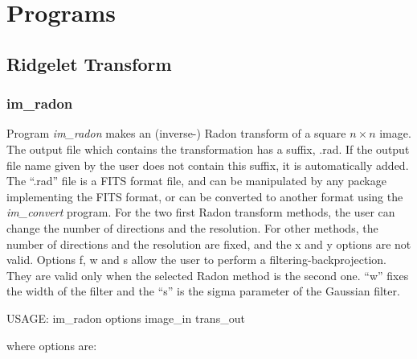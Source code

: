 \chapter{\projcur Programs}
\section{Ridgelet Transform}
\subsection{im\_radon}
Program {\em im\_radon} makes an (inverse-) Radon transform of a square
$n \times n$ image.
The output file which contains the transformation has a 
suffix, .rad. If the output file name
given by the user does not contain this suffix, it is automatically
added. The ``.rad'' file is a FITS format file, and can be manipulated by
any package implementing the FITS format, or can be converted to another
format using the {\em im\_convert} program.
For the two first Radon transform methods, the user can change the
number of directions and the resolution. For other methods, the 
number of directions and the resolution are fixed, and the
x and y options are not valid. Options f, w and s allow the user to perform
a filtering-backprojection. They are valid only when the selected Radon
method is the second one. ``w'' fixes the width of the filter and the
``s'' is the sigma parameter of the Gaussian filter.
{\bf
\begin{center}
 USAGE:  im\_radon  options image\_in trans\_out
\end{center}}
where options are:

